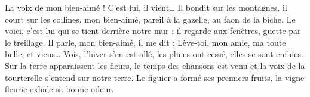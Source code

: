 La voix de mon bien-aimé ! C’est lui, il vient… Il bondit sur les montagnes, il court sur les collines,
mon bien-aimé, pareil à la gazelle, au faon de la biche. Le voici, c’est lui qui se tient derrière notre mur : il regarde aux fenêtres, guette par le treillage.
Il parle, mon bien-aimé, il me dit : Lève-toi, mon amie, ma toute belle, et viens…
Vois, l’hiver s’en est allé, les pluies ont cessé, elles se sont enfuies.
Sur la terre apparaissent les fleurs, le temps des chansons est venu et la voix de la tourterelle s’entend sur notre terre.
Le figuier a formé ses premiers fruits, la vigne fleurie exhale sa bonne odeur.
